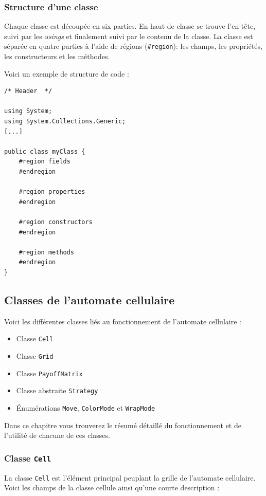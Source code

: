 \documentclass[a4paper, french]{article}
\begin{document}
\subsubsection{Structure d'une classe}
Chaque classe est découpée en six parties. En haut de classe se trouve l'en-tête, suivi par les \textit{usings} et finalement suivi par le contenu de la classe. La classe est séparée en quatre parties à l'aide de régions (\texttt{\#region}): les champs, les propriétés, les constructeurs et les méthodes.

Voici un exemple de structure de code :

\begin{lstlisting}
/* Header  */

using System;
using System.Collections.Generic;
[...]

public class myClass {
    #region fields
    #endregion
    
    #region properties
    #endregion
    
    #region constructors
    #endregion
    
    #region methods
    #endregion
}
\end{lstlisting}

\pagebreak
\subsection{Classes de l'automate cellulaire}
Voici les différentes classes liés au fonctionnement de l'automate cellulaire :
\begin{itemize}
    \item Classe \texttt{Cell}
    \item Classe \texttt{Grid}
    \item Classe \texttt{PayoffMatrix}
    \item Classe abstraite \texttt{Strategy}
    \item Énumérations \texttt{Move}, \texttt{ColorMode} et \texttt{WrapMode}
\end{itemize}

Dans ce chapitre vous trouverez le résumé détaillé du fonctionnement et de l'utilité de chacune de ces classes.

\subsubsection{Classe \texttt{Cell}}
La classe \texttt{Cell} est l'élément principal peuplant la grille de l'automate cellulaire. Voici les champs de la classe cellule ainsi qu'une courte description :  
\end{document}
